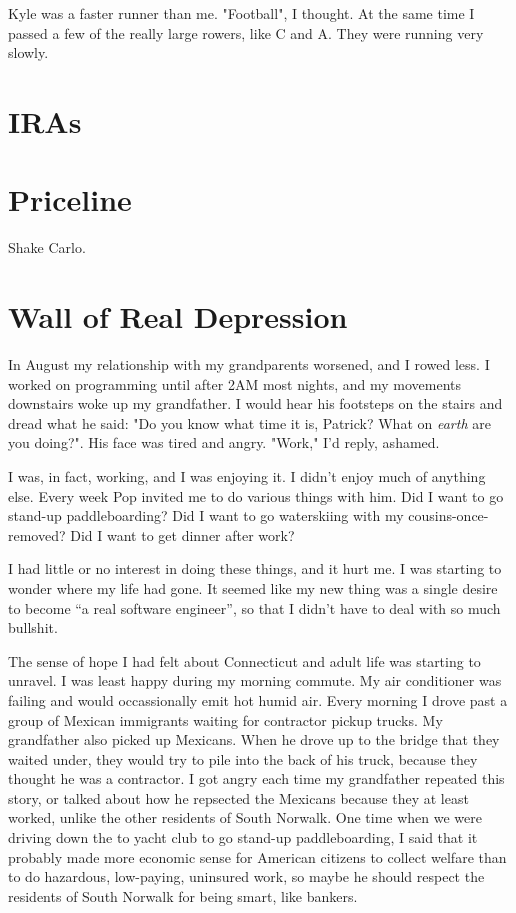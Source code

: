\documentclass[12pt]{memoir}
\begin{document}
Kyle was a faster runner than me.  "Football", I thought.  At the same time I
passed a few of the really large rowers, like C and A.  They were
running very slowly.  

\chapter{IRAs}


\chapter{Priceline}
Shake Carlo.  


\chapter{Wall of Real Depression}
In August my relationship with my grandparents worsened, and I rowed less.  I
worked on programming until after 2AM most nights, and my movements downstairs
woke up my grandfather.  I would hear his footsteps on the stairs and dread what
he said: "Do you know what time it is, Patrick?  What on \textit{earth} are you
doing?".  His face was tired and angry. "Work," I'd reply, ashamed.

I was, in fact, working, and I was enjoying it.  I didn't enjoy much of anything
else.  Every week Pop invited me to do various things with him.  Did I want to
go stand-up paddleboarding?  Did I want to go waterskiing with my cousins-once-
removed?  Did I want to get dinner after work?  

I had little or no interest in doing these things, and it hurt me.  I was
starting to wonder where my life had gone.  It seemed like my new thing was
a single desire to become ``a real software engineer'', so that I didn't have to
deal with so much bullshit.  

The sense of hope I had felt about Connecticut and adult life was starting to
unravel.  I was least happy during my morning commute.  My air conditioner was
failing and would occassionally emit hot humid air.  Every morning I drove past
a group of Mexican immigrants waiting for contractor pickup trucks.  My
grandfather also picked up Mexicans.  When he drove up to the bridge that they
waited under, they would try to pile into the back of his truck, because they
thought he was a contractor.  I got angry each time my grandfather repeated this
story, or talked about how he repsected the Mexicans because they at least
worked, unlike the other residents of South Norwalk.  One time when we were
driving down the to yacht club to go stand-up paddleboarding, I said that
it probably made more economic sense for American citizens to collect welfare
than to do hazardous, low-paying, uninsured work, so maybe he should respect the
residents of South Norwalk for being smart, like bankers. 
\end{document}
